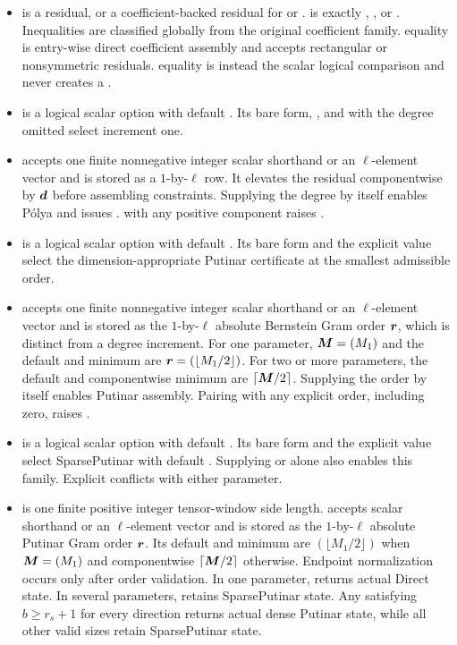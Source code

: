 \begin{itemize}[leftmargin=*]
  \item {} is a  residual, or a coefficient-backed  residual for  or .  is exactly , , or . Inequalities are classified globally from the original coefficient family.  equality is entry-wise direct coefficient assembly and accepts rectangular or nonsymmetric residuals.  equality is instead the scalar logical comparison  and never creates a .
  \item {} is a logical scalar option with default . Its bare form, , and  with the degree omitted select increment one.
  \item {} accepts one finite nonnegative integer scalar shorthand or an $\ell$-element vector and is stored as a $1$-by-$\ell$ row. It elevates the residual componentwise by $\boldsymbol{d}$ before assembling constraints. Supplying the degree by itself enables P\'olya and issues .  with any positive component raises .
  \item {} is a logical scalar option with default . Its bare form and the explicit value  select the dimension-appropriate Putinar certificate at the smallest admissible order.
  \item {} accepts one finite nonnegative integer scalar shorthand or an $\ell$-element vector and is stored as the $1$-by-$\ell$ absolute Bernstein Gram order $\boldsymbol{r}$, which is distinct from a degree increment. For one parameter, $\boldsymbol{M}=(M_1)$ and the default and minimum are $\boldsymbol{r}=(\lfloor M_1/2\rfloor)$. For two or more parameters, the default and componentwise minimum are $\lceil\boldsymbol{M}/2\rceil$. Supplying the order by itself enables Putinar assembly. Pairing  with any explicit order, including zero, raises .
  \item {} is a logical scalar option with default . Its bare form and the explicit value  select SparsePutinar with default . Supplying  or  alone also enables this family. Explicit  conflicts with either parameter.
  \item {} is one finite positive integer tensor-window side length.  accepts scalar shorthand or an $\ell$-element vector and is stored as the $1$-by-$\ell$ absolute Putinar Gram order $\boldsymbol{r}$. Its default and minimum are $(\lfloor M_1/2\rfloor)$ when $\boldsymbol{M}=(M_1)$ and componentwise $\lceil\boldsymbol{M}/2\rceil$ otherwise. Endpoint normalization occurs only after order validation. In one parameter,  returns actual Direct state. In several parameters,  retains SparsePutinar state. Any  satisfying $b\ge r_s+1$ for every direction returns actual dense Putinar state, while all other valid sizes retain SparsePutinar state.

\end{itemize}
